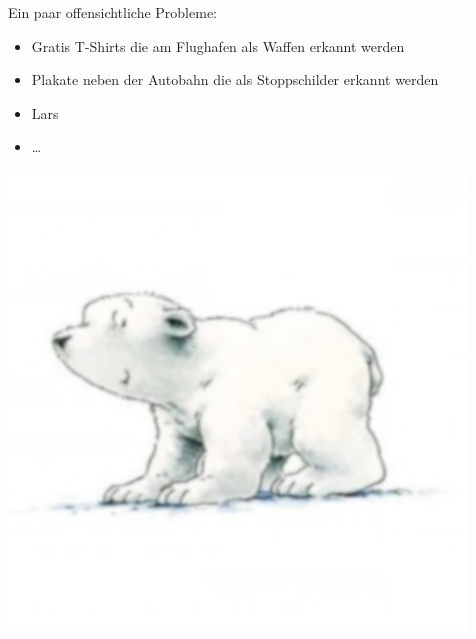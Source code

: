 \documentclass[aspectratio=169,x11names]{beamer}
\begin{document}
\begin{frame}
Ein paar offensichtliche Probleme:
\bigskip
\begin{multicols}{2}
\begin{itemize}
\pause\item Gratis T-Shirts die am Flughafen als Waffen erkannt werden
\pause\item Plakate neben der Autobahn die als Stoppschilder erkannt werden
\pause\item Lars\pause
\item \dots
\end{itemize}
\columnbreak

\begin{center}
\includegraphics[scale=0.25]{images/lars_eisbaer.png} 
\end{center}

\end{multicols}
\end{frame}
\end{document}
